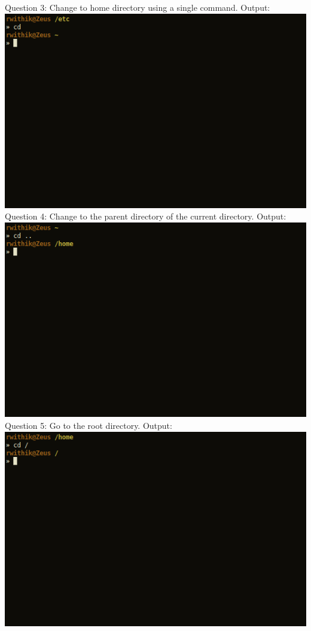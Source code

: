 \documentclass[10pt,a4paper,titlepage]{report}
\begin{document}
Question 3: Change to home directory using a single command.\newline
Output:\newline
\includegraphics[scale=.5]{../Images/Cycle2/3.png}\newline
\newline
Question 4: Change to the parent directory of the current directory.\newline
Output:\newline
\includegraphics[scale=.5]{../Images/Cycle2/4.png}
\pagebreak
\newline
Question 5: Go to the root directory.\newline
Output:\newline
\includegraphics[scale=.5]{../Images/Cycle2/5.png}\newline
\end{document}

